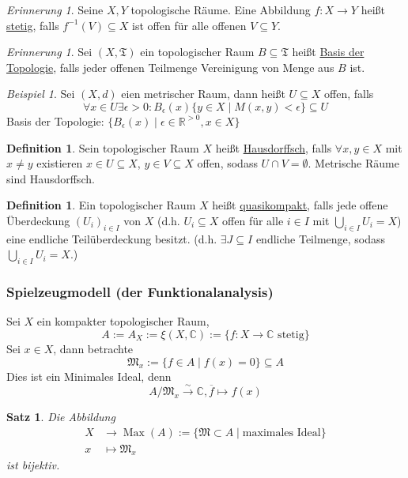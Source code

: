\documentclass[10pt,a4paper]{article}
\newcommand{\R}{\ensuremath{\mathbb{R}}}
\newcommand{\C}{\ensuremath{\mathbb{C}}}
\newcommand{\ol}[1]{\overline{#1}}
\newcommand{\ul}[1]{\underline{#1}}
\newcommand{\isomfunc}{\ensuremath{\xrightarrow{\sim}}}
\newcounter{thm}[section]
\let\oldsubsubsection\subsubsection
\renewcommand{\subsubsection}{\stepcounter{thm}\oldsubsubsection}
\theoremstyle{definition}
\newtheorem{definition}[thm]{Definition}
\theoremstyle{plain}
\newtheorem{satz}[thm]{Satz}
\theoremstyle{remark}
\newtheorem{rem}[thm]{Erinnerung}
\newtheorem{exm}[thm]{Beispiel}
\begin{document}
\begin{rem}
	Seine $X,Y$ topologische Räume. Eine Abbildung $f:X\rightarrow Y$ heißt \ul{stetig}, falls $f^{-1}(V)\subseteq X$ ist offen für alle offenen $V\subseteq Y$.
\end{rem}

\begin{rem}
	Sei $(X,\mathfrak T)$ ein topologischer Raum $B\subseteq \mathfrak T$ heißt \ul{Basis der Topologie}, falls jeder offenen Teilmenge Vereinigung von Menge aus $B$ ist.
\end{rem}

\begin{exm}
	Sei $(X,d)$ eien metrischer Raum, dann heißt $U\subseteq X$ offen, falls \[\forall x\in U\exists\epsilon>0:B_\epsilon(x)\{y\in X\mid M(x,y)<\epsilon\}\subseteq U\]Basis der Topologie: $\{B_\epsilon(x)\mid\epsilon\in \R^{>0},x\in X\}$
\end{exm}

\begin{definition}
	Sein topologischer Raum $X$ heißt \underline{Hausdorffsch}, falls $\forall x,y\in X$ mit $x\neq y$ existieren $x\in U\subseteq X$, $y\in V\subseteq X$ offen, sodass $U\cap V=\emptyset$.
	Metrische Räume sind Hausdorffsch.
\end{definition}

\begin{definition}
	Ein topologischer Raum $X$ heißt \ul{quasikompakt}, falls jede offene Überdeckung $(U_i)_{i\in I}$ von $X$ (d.h. $U_i\subseteq X$ offen für alle $i\in I$ mit $\bigcup_{i\in I}U_i=X$) eine endliche Teilüberdeckung besitzt.
	(d.h. $\exists J\subseteq I$ endliche Teilmenge, sodass $\bigcup_{i\in I}U_i=X$.)
\end{definition}




\subsubsection{Spielzeugmodell (der Funktionalanalysis)}
Sei $X$ ein kompakter topologischer Raum,
\[A:=A_X:=\xi (X,\C):=\{f:X\to \C\text{ stetig}\}\]
Sei $x\in X$, dann betrachte
\[\mathfrak M_x:=\{f\in A\mid f(x)=0\}\subseteq A\]
Dies ist ein Minimales Ideal, denn
\[A/\mathfrak M_x\isomfunc \C, \ol{f}\mapsto f(x)\]

\begin{satz}
	Die Abbildung 
	\begin{align*}
		X&\rightarrow \operatorname{Max}(A):=\{\mathfrak M\subset A\mid \text{maximales Ideal}\}\\
		x&\mapsto\mathfrak M_x
	\end{align*}
	ist bijektiv.
\end{satz}
\end{document}
